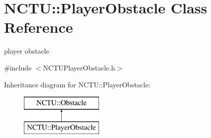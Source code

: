 \hypertarget{class_n_c_t_u_1_1_player_obstacle}{}\section{N\+C\+TU\+:\+:Player\+Obstacle Class Reference}
\label{class_n_c_t_u_1_1_player_obstacle}


player obstacle  




{\ttfamily \#include $<$N\+C\+T\+U\+Player\+Obstacle.\+h$>$}

Inheritance diagram for N\+C\+TU\+:\+:Player\+Obstacle\+:\begin{figure}[H]
\begin{center}
\leavevmode
\includegraphics[height=2.000000cm]{class_n_c_t_u_1_1_player_obstacle}
\end{center}
\end{figure}
